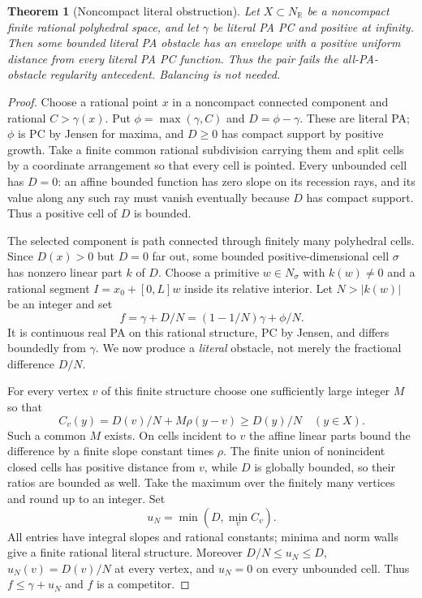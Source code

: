 \documentclass[11pt]{article}
\newtheorem{theorem}{Theorem}
\newcommand{\R}{\mathbb R}
\begin{document}
\begin{theorem}[Noncompact literal obstruction]\label{literal-general}
Let $X\subset N_\R$ be a noncompact finite rational polyhedral space,
and let $\gamma$ be literal PA PC and positive at infinity.
Then some bounded literal PA obstacle has an envelope with a positive
uniform distance from every literal PA PC function. Thus the pair
fails the all-PA-obstacle regularity antecedent. Balancing is not needed.
\end{theorem}
\begin{proof}
Choose a rational point $x$ in a noncompact connected component and
rational $C>\gamma(x)$. Put $\phi=\max(\gamma,C)$ and
$D=\phi-\gamma$. These are literal PA; $\phi$ is PC by Jensen for
maxima, and $D\geq0$ has compact support by positive growth.
Take a finite common rational subdivision carrying them and split
cells by a coordinate arrangement so that every cell is pointed.
Every unbounded cell has $D=0$: an affine bounded function has zero
slope on its recession rays, and its value along any such ray must
vanish eventually because $D$ has compact support. Thus a positive
cell of $D$ is bounded.

The selected component is path connected through finitely many
polyhedral cells. Since $D(x)>0$ but $D=0$ far out, some bounded
positive-dimensional cell $\sigma$ has nonzero linear part $k$ of $D$.
Choose a primitive $w\in N_\sigma$ with $k(w)\ne0$ and a rational
segment $I=x_0+[0,L]w$ inside its relative interior.
Let $N>|k(w)|$ be an integer and set
\[
 f=\gamma+D/N=(1-1/N)\gamma+\phi/N.
\]
It is continuous real PA on this rational structure, PC by Jensen,
and differs boundedly from $\gamma$. We now produce a \emph{literal}
obstacle, not merely the fractional difference $D/N$.

For every vertex $v$ of this finite structure choose one sufficiently
large integer $M$ so that
\[
 C_v(y)=D(v)/N+M\rho(y-v)\geq D(y)/N\quad(y\in X).
\]
Such a common $M$ exists. On cells incident to $v$ the affine linear
parts bound the difference by a finite slope constant times $\rho$.
The finite union of nonincident closed cells has positive distance
from $v$, while $D$ is globally bounded, so their ratios are bounded
as well. Take the maximum over the finitely many vertices and round
up to an integer. Set
\[
 u_N=\min\left(D,\min_v C_v\right).
\]
All entries have integral slopes and rational constants; minima and
norm walls give a finite rational literal structure. Moreover
$D/N\leq u_N\leq D$, $u_N(v)=D(v)/N$ at every vertex, and $u_N=0$
on every unbounded cell. Thus $f\leq\gamma+u_N$ and $f$ is a competitor.


\end{proof}
\end{document}
